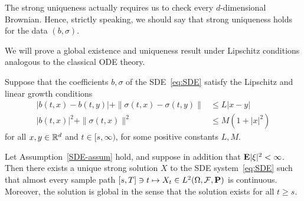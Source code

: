 \begin{remark}
	The strong uniqueness actually requires us to check every $d$-dimensional Brownian. Hence, strictly speaking, we should say that strong uniqueness holds for the data $(b,\sigma)$.
\end{remark}

We will prove a global existence and uniqueness result under Lipschitz conditions analogous to the classical ODE theory.

\begin{assumption}
	\label{SDE-assum}
	Suppose that the coefficients $b,\sigma$ of the SDE~\eqref{eq:SDE} satisfy the Lipschitz and linear growth conditions
	\begin{align}
		|b(t,x)-b(t,y)|+\|\sigma(t,x)-\sigma(t,y)\| &\le L|x-y| \label{eq:Lip}\\
		|b(t,x)|^2 + \|\sigma(t,x)\|^2 &\le M(1+|x|^2) \label{eq:growth}
	\end{align}
	for all $x,y\in\mathbb{R}^d$ and $t\in [s,\infty)$, for some positive constants $L,M$.
\end{assumption}

\begin{theorem}
	Let Assumption~\ref{SDE-assum} hold, and suppose in addition that $\mathbf{E}|\xi|^2<\infty$. Then there exists a unique strong solution $X$ to the SDE system~\eqref{eq:SDE} such that almost every sample path $[s,T]\ni t\mapsto X_t\in L^2(\Omega,\mathcal{F},\mathbf{P})$ is continuous. Moreover, the solution is global in the sense that the solution exists for all $t\ge s$.
\end{theorem}

